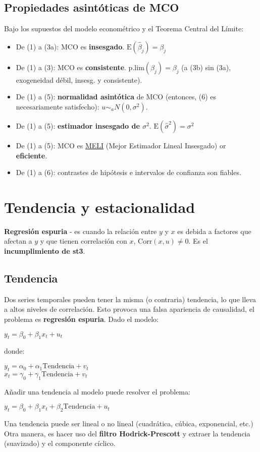 \documentclass[10pt, a4paper, landscape]{extarticle}
\newcommand{\E}{\mathrm{E}}
\newcommand{\Corr}{\mathrm{Corr}}
\begin{document}
\begin{multicols}{3}
	\subsection*{Propiedades asintóticas de MCO}
		Bajo los supuestos del modelo econométrico y el Teorema Central del Límite:
		\begin{itemize}[leftmargin=*]
			\item De (1) a (3a): MCO es \textbf{insesgado}. $\E(\hat{\beta}_j) = \beta_j$
			\item De (1) a (3): MCO es \textbf{consistente}. $\mathrm{p.lim}(\hat{\beta}_j) = \beta_j$ (a (3b) sin (3a), exogeneidad débil, insesg. y consistente).
			\item De (1) a (5): \textbf{normalidad asintótica} de MCO (entonces, (6) es necesariamente satisfecho): $u \sim_a N(0,\sigma^2)$.
			\item De (1) a (5): \textbf{estimador insesgado de $\sigma^2$}. $\E(\hat{\sigma}^2) = \sigma^2$
			\item De (1) a (5): MCO es \textcolor{blue}{\href{https://www.youtube.com/watch?v=68ugkg9RePc}{MELI}} (Mejor Estimador Lineal Insesgado) or \textbf{eficiente}. 
			\item De (1) a (6): contrastes de hipótesis e intervalos de confianza son fiables.
		\end{itemize}
\columnbreak
\section*{Tendencia y estacionalidad}
	\textbf{Regresión espuria} - es cuando la relación entre $y$ y $x$ es debida a factores que afectan a $y$ y que tienen correlación con $x$, $\Corr(x, u) \neq 0$. Es el  \textbf{incumplimiento de st3}.
	\subsection*{Tendencia}
		Dos series temporales pueden tener la misma (o contraria) tendencia, lo que lleva a altos niveles de correlación. Esto provoca una falsa apariencia de causalidad, el problema es \textbf{regresión espuria}. Dado el modelo:
		\begin{center}
			$y_t = \beta_0 + \beta_1 x_t + u_t$
		\end{center}
		donde:
		\begin{center}
			$y_t = \alpha_0 + \alpha_1 \mathrm{Tendencia} + v_t$ \\
			$x_t = \gamma_0 + \gamma_1 \mathrm{Tendencia} + v_t$
		\end{center}
		Añadir una tendencia al modelo puede resolver el problema:
		\begin{center}
			$y_t = \beta_0 + \beta_1 x_t + \beta_2 \mathrm{Tendencia} + u_t$
		\end{center}
		Una tendencia puede ser lineal o no lineal (cuadrática, cúbica, exponencial, etc.) \\
		Otra manera, es hacer uso del \textbf{filtro Hodrick-Prescott} y extraer la tendencia (suavizado) y el componente cíclico.

\end{multicols}
\end{document}
